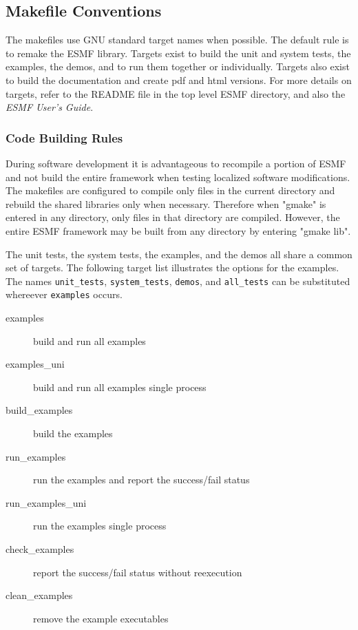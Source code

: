 
\subsection{Makefile Conventions} 	 

The makefiles use GNU standard target names when possible.
The default rule is to remake the ESMF library.  Targets exist
to build the unit and system tests, the examples, the demos,
and to run them together or individually.  Targets also exist
to build the documentation and create pdf and html versions.
For more details on targets, refer to the README file in the top
level ESMF directory, and also the {\it ESMF User's Guide}.


\subsubsection{Code Building Rules} 
During software development it is advantageous to recompile a portion of
ESMF and not build the entire framework when testing localized software
modifications.  The makefiles are configured to compile only files in the
current directory and rebuild the shared libraries only when necessary.
Therefore when "gmake" is entered in any directory, only files in that
directory are compiled.  However, the entire ESMF framework may be built
from any directory by entering "gmake lib".

The unit tests, the system tests, the examples, and the demos all share
a common set of targets.  The following target list illustrates the
options for the examples.  The names {\tt unit\_tests}, {\tt system\_tests},
{\tt demos}, and {\tt all\_tests} can be substituted whereever {\tt examples}
occurs.
\begin{description} 
\item [examples] build and run all examples
\item [examples\_uni] build and run all examples single process
\item [build\_examples] build the examples
\item [run\_examples] run the examples and report the success/fail status
\item [run\_examples\_uni] run the examples single process
\item [check\_examples] report the success/fail status without reexecution
\item [clean\_examples] remove the example executables
\end{description} 

